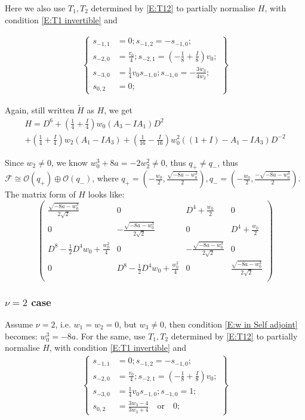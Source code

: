 \documentclass[11pt]{article}
\theoremstyle{definition}
\theoremstyle{plain}
\numberwithin{equation}{section}
\begin{document}
Here we also use $T_1,T_2$ determined by \eqref{E:T12} to partially normalise  $H$, with  condition \eqref{E:T1 invertible} and 

\begin{align}
	\label{E:Second conjugation self v=1}
	\left\{\begin{aligned}
		s_{-1,1}&=0;s_{-1,2}=-s_{-1,0};
		\\s_{-2,0}&=\frac{v_0}{4};s_{-2,1}=(-\frac{1}{8}+\frac{I}{8}) v_0;
		\\s_{-3,0}&=\frac{1}{4} v_0s_{-1,0}; s_{-1,0}=-\frac{3 w_3}{4 w_2};
		\\s_{0,2}&= 0;
		\end{aligned}\right\}
\end{align}

Again, still written $\tilde{H}$ as $H$, we get
\begin{multline*}
H=D^6+(\frac{1}{4}+\frac{I}{4})w_0 (A_3-I A_1)D^2
\\+(\frac{1}{4}+\frac{I}{4}) w_2 (A_1-I A_3)+(\frac{1}{16}-\frac{I}{16})w_0^2 ((1+I)-A_1-I A_3)D^{-2}
\end{multline*}

Since $w_2\neq 0$, we know $w^3_0+8a=-2w_2^2\neq 0$, thus $q_+\neq q_-$, thus $\mathcal{F}\cong \mathcal{O}(q_+)\oplus \mathcal{O}(q_-)$, where $q_+=(-\frac{w_0}{2},\frac{\sqrt{-8a-w_0^3}}{2}),q_-=(-\frac{w_0}{2},\frac{-\sqrt{-8a-w_0^3}}{2})$. The matrix form of $H$ looks like:
$$
\left(
\begin{array}{cccc}
	\frac{\sqrt{-8 a-w_0^3}}{2 \sqrt{2}} & 0 & D^4+\frac{w_0}{2} & 0 \\
	0 & -\frac{\sqrt{-8 a-w_0^3}}{2 \sqrt{2}} & 0 & D^4+\frac{w_0}{2} \\
	D^8-\frac{1}{2} D^4 w_0+\frac{w_0^2}{4} & 0 & -\frac{\sqrt{-8 a-w_0^3}}{2 \sqrt{2}} & 0 \\
	0 & D^8-\frac{1}{2} D^4 w_0+\frac{w_0^2}{4} & 0 & \frac{\sqrt{-8 a-w_0^3}}{2 \sqrt{2}} \\
\end{array}
\right)
$$

\subsubsection{$\nu=2$ case}
\label{S:nu2}

Assume $\nu=2$, i.e. $w_1=w_2=0$, but $w_3\neq 0$, then condition \eqref{E:w in Self adjoint} becomes: $w_0^3=-8a$. For the same, use $T_1,T_2$ determined by \eqref{E:T12} to partially normalise $H$, with  condition \eqref{E:T1 invertible} and 
\begin{align}
	\label{E:Second conjugation self v=2}
	\left\{\begin{aligned}
		s_{-1,1}&=0;s_{-1,2}=-s_{-1,0};
		\\s_{-2,0}&=\frac{v_0}{4};s_{-2,1}=(-\frac{1}{8}+\frac{I}{8}) v_0;
		\\s_{-3,0}&=\frac{1}{4} v_0s_{-1,0}; s_{-1,0}=1;
		\\s_{0,2}&= \frac{ 3 w_3-4}{3 w_3+4}\quad \text{or} \quad 0;
		\end{aligned} \right\}
\end{align}
\end{document}
